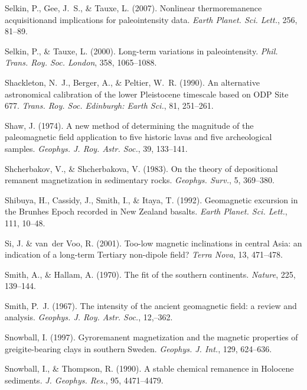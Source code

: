 \documentclass[,plain]{tauxe}
\begin{document}
\begin{thebibliography}{}
\bibitem{}%
Selkin, P., Gee, J.~S., \& Tauxe, L. (2007).
Nonlinear thermoremanence acquisition\break and implications for paleointensity data.\break
{\it Earth Planet. Sci. Lett.}, 256, 81--89.

\bibitem{}%
Selkin, P., \& Tauxe, L. (2000).
Long-term variations in paleointensity.
{\it Phil. Trans. Roy. Soc. London}, 358, 1065--1088.

\bibitem{}%
Shackleton, N.~J., Berger, A., \& Peltier, W.~R. (1990).
An alternative astronomical calibration of the lower Pleistocene timescale based on {ODP} Site 677.
{\it Trans. Roy. Soc. Edinburgh: Earth Sci.}, 81, 251--261.

\bibitem{}%
Shaw, J. (1974).
A new method of determining the magnitude of the paleomagnetic field application to five historic lavas and five archeological samples.
{\it Geophys. J. Roy. Astr. Soc.}, 39, 133--141.

\bibitem{}%
Shcherbakov, V., \& Shcherbakova, V. (1983).
On the theory of depositional remanent magnetization in sedimentary rocks.
{\it Geophys. Surv.}, 5, 369--380.

\bibitem{}%
Shibuya, H., Cassidy, J., Smith, I., \& Itaya, T. (1992).
Geomagnetic excursion in the Brunhes Epoch recorded in New Zealand basalts.
{\it Earth Planet. Sci. Lett.}, 111, 10--48.

\bibitem{}%
Si, J. \& van~der Voo, R. (2001).
Too-low magnetic inclinations in central Asia: an indication of a long-term Tertiary non-dipole field?
{\it Terra Nova}, 13, 471--478.

\bibitem{}%
Smith, A., \& Hallam, A. (1970).
The fit of the southern continents.
{\it Nature}, 225, 139--144.

\bibitem{}%
Smith, P.~J. (1967).
The intensity of the ancient geomagnetic field: a review and analysis.
{\it Geophys. J. Roy. Astr. Soc.}, 12,--362.

\bibitem{}%
Snowball, I. (1997).
Gyroremanent magnetization and the magnetic properties of greigite-bearing clays in southern Sweden.
{\it Geophys. J. Int.}, 129, 624--636.

\bibitem{}%
Snowball, I., \& Thompson, R. (1990). A stable chemical remanence in
Holocene sediments. {\it J. Geophys. Res.}, 95, 4471--4479.


\end{thebibliography}
\end{document}
